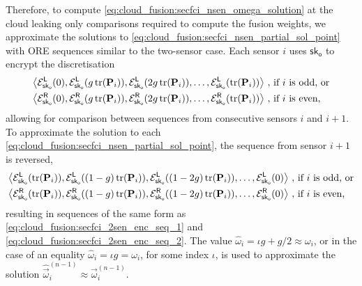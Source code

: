 Therefore, to compute \eqref{eq:cloud_fusion:secfci_nsen_omega_solution} at the cloud leaking only comparisons required to compute the fusion weights, we approximate the solutions to \eqref{eq:cloud_fusion:secfci_nsen_partial_sol_point} with ORE sequences similar to the two-sensor case. Each sensor $i$ uses $\mathsf{sk}_{\mathsf{o}}$ to encrypt the discretisation 
\begin{equation}\label{eq:cloud_fusion:secfci_nsen_enc_seqs}
    \begin{split}
        \left\langle\mathcal{E}^{\mathsf{L}}_{\mathsf{sk}_{\mathsf{o}}}(0), \mathcal{E}^{\mathsf{L}}_{\mathsf{sk}_{\mathsf{o}}}(g\tr(\mat{P}_i)), \mathcal{E}^{\mathsf{L}}_{\mathsf{sk}_{\mathsf{o}}}(2g\tr(\mat{P}_i)),\dots,\mathcal{E}^{\mathsf{L}}_{\mathsf{sk}_{\mathsf{o}}}(\tr(\mat{P}_i))\right\rangle\,,\ & \text{if } i \text{ is odd, or}\\
        \left\langle\mathcal{E}^{\mathsf{R}}_{\mathsf{sk}_{\mathsf{o}}}(0), \mathcal{E}^{\mathsf{R}}_{\mathsf{sk}_{\mathsf{o}}}(g\tr(\mat{P}_i)), \mathcal{E}^{\mathsf{R}}_{\mathsf{sk}_{\mathsf{o}}}(2g\tr(\mat{P}_i)),\dots,\mathcal{E}^{\mathsf{R}}_{\mathsf{sk}_{\mathsf{o}}}(\tr(\mat{P}_i))\right\rangle\,,\ & \text{if } i \text{ is even,}
    \end{split}
\end{equation}
allowing for comparison between sequences from consecutive sensors $i$ and $i+1$. To approximate the solution to each \eqref{eq:cloud_fusion:secfci_nsen_partial_sol_point}, the sequence from sensor $i+1$ is reversed,
\begin{equation}\label{eq:cloud_fusion:secfci_nsen_enc_seqs_reversed}
    \begin{split}
        \left\langle\mathcal{E}^{\mathsf{L}}_{\mathsf{sk}_{\mathsf{o}}}(\tr(\mat{P}_i)),\mathcal{E}^{\mathsf{L}}_{\mathsf{sk}_{\mathsf{o}}}((1-g)\tr(\mat{P}_i)), \mathcal{E}^{\mathsf{L}}_{\mathsf{sk}_{\mathsf{o}}}((1-2g)\tr(\mat{P}_i)),\dots,\mathcal{E}^{\mathsf{L}}_{\mathsf{sk}_{\mathsf{o}}}(0)\right\rangle\,,\ & \text{if } i \text{ is odd, or}\\
        \left\langle\mathcal{E}^{\mathsf{R}}_{\mathsf{sk}_{\mathsf{o}}}(\tr(\mat{P}_i)), \mathcal{E}^{\mathsf{R}}_{\mathsf{sk}_{\mathsf{o}}}((1-g)\tr(\mat{P}_i)), \mathcal{E}^{\mathsf{R}}_{\mathsf{sk}_{\mathsf{o}}}((1-2g)\tr(\mat{P}_i)),\dots,\mathcal{E}^{\mathsf{R}}_{\mathsf{sk}_{\mathsf{o}}}(0)\right\rangle\,,\ & \text{if } i \text{ is even,}
    \end{split}
\end{equation}
resulting in sequences of the same form as \eqref{eq:cloud_fusion:secfci_2sen_enc_seq_1} and \eqref{eq:cloud_fusion:secfci_2sen_enc_seq_2}. The value $\hat{\omega}_i = \iota g + g/2 \approx \omega_i$, or in the case of an equality $\hat{\omega}_i = \iota g = \omega_i$, for some index $\iota$, is used to approximate the solution $\hat{\vec{\omega}}_i^{(n-1)} \approx \vec{\omega}_i^{(n-1)}$. 
